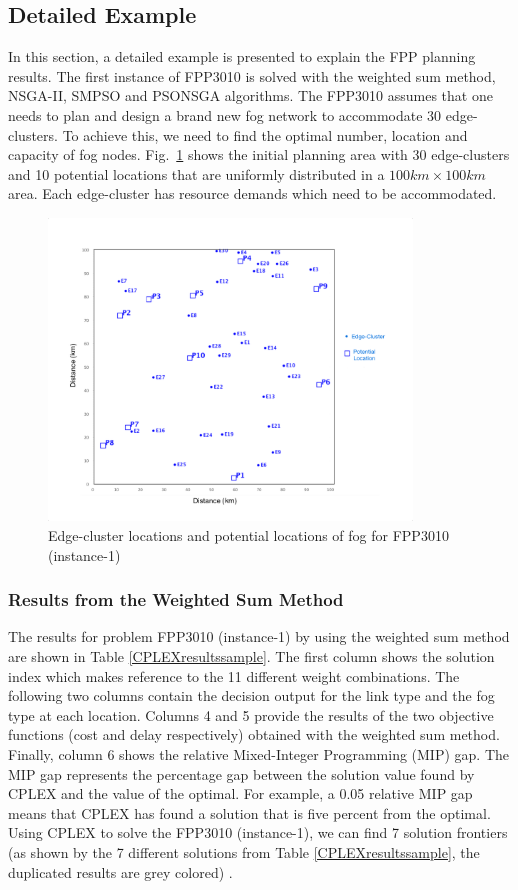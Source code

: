 \documentclass[10pt,journal,compsoc]{IEEEtran}
\newcommand{\Fig}[1]{Fig.~\ref{#1}}
\begin{document}
\subsection{Detailed Example}
In this section, a detailed example is presented to explain the FPP planning results. The first instance of FPP3010 is solved with the weighted sum method, NSGA-II, SMPSO and PSONSGA algorithms. The FPP3010 assumes that one needs to plan and design a brand new fog network to accommodate 30 edge-clusters. To achieve this, we need to find the optimal number, location and capacity of fog nodes. \Fig{nettopology} shows the initial planning area with 30 edge-clusters and 10 potential locations that are uniformly distributed in a $100km \times 100km$ area. 
Each edge-cluster has resource demands which need to be accommodated. 
\begin{figure}[H]
\centerline{\includegraphics[trim=0 50 0 50,clip,width=3.8in]{100x100problem.png}}
\caption{Edge-cluster locations and potential locations of fog for FPP3010 (instance-1)} 
\label{nettopology}
\end{figure}
\subsubsection{Results from the Weighted Sum Method}
The results for problem FPP3010 (instance-1) by using the weighted sum method are shown in Table \ref{CPLEXresultssample}. The first column shows the solution index which makes reference to the 11 different weight combinations. The following two columns contain the decision output for the link type and the fog type at each location. Columns 4 and 5 provide the results of the two objective functions (cost and delay respectively) obtained with the weighted sum method. Finally, column 6 shows the relative Mixed-Integer Programming (MIP) gap. The MIP gap represents the percentage gap between the solution value found by CPLEX and the value of the optimal. For example, a 0.05 relative MIP gap means that CPLEX has found a solution that is five percent from the optimal. Using CPLEX to solve the FPP3010 (instance-1), we can find 7 solution frontiers (as shown by the 7 different solutions from Table \ref{CPLEXresultssample}, the duplicated results are grey colored) . 
\end{document}
